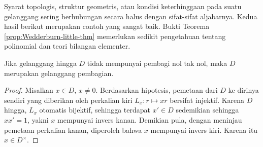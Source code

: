Syarat topologis, struktur geometris, atau kondisi keterhinggaan pada suatu gelanggang sering berhubungan secara halus dengan sifat-sifat aljabarnya. Kedua hasil berikut merupakan contoh yang sangat baik. Bukti Teorema \ref{prop:Wedderburn-little-thm} memerlukan sedikit pengetahuan tentang polinomial dan teori bilangan elementer.

\begin{proposition}
	Jika gelanggang hingga $D$ tidak mempunyai pembagi nol tak nol, maka $D$ merupakan gelanggang pembagian.
\end{proposition}
\begin{proof}
	Misalkan $x \in D$, $x \neq 0$. Berdasarkan hipotesis, pemetaan dari $D$ ke dirinya sendiri yang diberikan oleh perkalian kiri $L_x: r \mapsto xr$ bersifat injektif. Karena $D$ hingga, $L_x$ otomatis bijektif, sehingga terdapat $x' \in D$ sedemikian sehingga $xx'=1$, yakni $x$ mempunyai invers kanan. Demikian pula, dengan meninjau pemetaan perkalian kanan, diperoleh bahwa $x$ mempunyai invers kiri. Karena itu $x \in D^\times$.
\end{proof}

